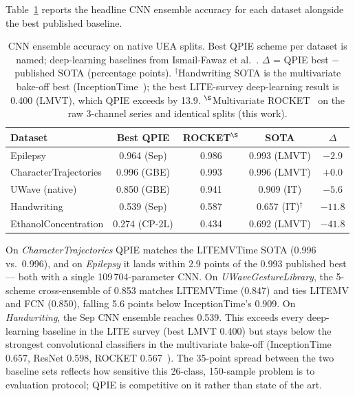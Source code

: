 \documentclass[conference,compsoc]{IEEEtran}
\begin{document}
Table~\ref{tab:main} reports the headline CNN ensemble accuracy for
each dataset alongside the best published baseline.

\begin{table}[t]
\caption{CNN ensemble accuracy on native UEA splits.
Best QPIE scheme per dataset is named; deep-learning baselines from
Ismail-Fawaz et al.~\cite{ismail2025lite}.
$\Delta$ = QPIE best $-$ published SOTA (percentage points).
$^\dagger$Handwriting SOTA is the multivariate bake-off best
(InceptionTime~\cite{ruiz2020bakeoff}); the best LITE-survey
deep-learning result is 0.400 (LMVT), which QPIE exceeds by 13.9.
$^\S$Multivariate ROCKET~\cite{dempster2020rocket} on the raw
3-channel series and identical splits (this work).}
\label{tab:main}
\centering
\setlength{\tabcolsep}{4pt}
\begin{tabular}{lcccc}
\toprule
Dataset & Best QPIE & ROCKET$^\S$ & SOTA & $\Delta$ \\
\midrule
Epilepsy              & 0.964 (Sep)  & 0.986 & 0.993 (LMVT)  & $-2.9$  \\
CharacterTrajectories & 0.996 (GBE)  & 0.993 & 0.996 (LMVT)  & $+0.0$  \\
UWave (native)        & 0.850 (GBE)  & 0.941 & 0.909 (IT)    & $-5.6$  \\
Handwriting           & 0.539 (Sep)  & 0.587 & 0.657 (IT)$^\dagger$ & $-11.8$ \\
EthanolConcentration  & 0.274 (CP-2L)& 0.434 & 0.692 (LMVT)  & $-41.8$ \\
\bottomrule
\end{tabular}
\end{table}

On \textit{CharacterTrajectories} QPIE matches the LITEMVTime SOTA
(0.996 vs.\ 0.996), and on \textit{Epilepsy} it lands within 2.9
points of the 0.993 published best --- both with a single
109\,704-parameter CNN.
On \textit{UWaveGestureLibrary}, the 5-scheme cross-ensemble of 0.853
matches LITEMVTime (0.847) and ties LITEMV and FCN (0.850), falling
5.6 points below InceptionTime's 0.909.
On \textit{Handwriting}, the Sep CNN ensemble reaches 0.539. This
exceeds every deep-learning baseline in the LITE survey (best LMVT
0.400) but stays below the strongest convolutional classifiers in the
multivariate bake-off (InceptionTime 0.657, ResNet 0.598, ROCKET
0.567~\cite{ruiz2020bakeoff}). The 35-point spread between the two
baseline sets reflects how sensitive this 26-class, 150-sample problem
is to evaluation protocol; QPIE is competitive on it rather than
state of the art.
\end{document}
